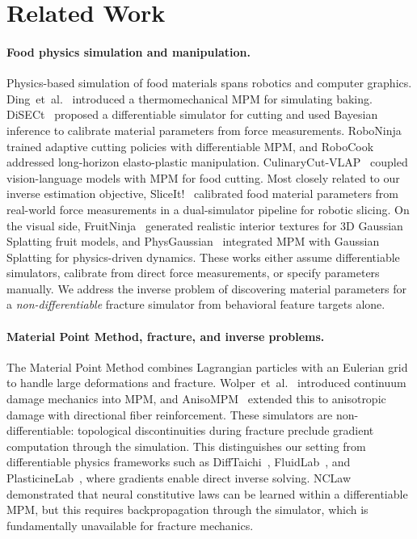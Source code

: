 \section{Related Work}
\label{sec:related}

\paragraph{Food physics simulation and manipulation.}
Physics-based simulation of food materials spans robotics and computer graphics. Ding~et~al.~\cite{ding2019thermomechanical} introduced a thermomechanical MPM for simulating baking. DiSECt~\cite{heiden2021disect} proposed a differentiable simulator for cutting and used Bayesian inference to calibrate material parameters from force measurements. RoboNinja~\cite{xu2023roboninja} trained adaptive cutting policies with differentiable MPM, and RoboCook~\cite{shi2023robocook} addressed long-horizon elasto-plastic manipulation. CulinaryCut-VLAP~\cite{koh2026culinarycut} coupled vision-language models with MPM for food cutting. Most closely related to our inverse estimation objective, SliceIt!~\cite{beltran2024sliceit} calibrated food material parameters from real-world force measurements in a dual-simulator pipeline for robotic slicing. On the visual side, FruitNinja~\cite{wu2025fruitninja} generated realistic interior textures for 3D Gaussian Splatting fruit models, and PhysGaussian~\cite{xie2024physgaussian} integrated MPM with Gaussian Splatting for physics-driven dynamics. These works either assume differentiable simulators, calibrate from direct force measurements, or specify parameters manually. We address the inverse problem of discovering material parameters for a \emph{non-differentiable} fracture simulator from behavioral feature targets alone.

\paragraph{Material Point Method, fracture, and inverse problems.}
The Material Point Method combines Lagrangian particles with an Eulerian grid to handle large deformations and fracture. Wolper~et~al.~\cite{wolper2019cdmpm} introduced continuum damage mechanics into MPM, and AnisoMPM~\cite{wolper2020anisompm} extended this to anisotropic damage with directional fiber reinforcement. These simulators are non-differentiable: topological discontinuities during fracture preclude gradient computation through the simulation. This distinguishes our setting from differentiable physics frameworks such as DiffTaichi~\cite{hu2020difftaichi}, FluidLab~\cite{xian2023fluidlab}, and PlasticineLab~\cite{huang2021plasticinelab}, where gradients enable direct inverse solving. NCLaw~\cite{ma2023nclaw} demonstrated that neural constitutive laws can be learned within a differentiable MPM, but this requires backpropagation through the simulator, which is fundamentally unavailable for fracture mechanics.

